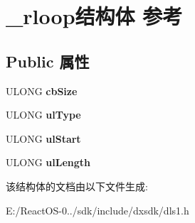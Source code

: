 \hypertarget{struct__rloop}{}\section{\+\_\+rloop结构体 参考}
\label{struct__rloop}
\subsection*{Public 属性}
\begin{DoxyCompactItemize}
\item 
\mbox{\label{struct__rloop_a14066c8888646ff2034e8e474b0f75e8}} 
U\+L\+O\+NG {\bfseries cb\+Size}
\item 
\mbox{\label{struct__rloop_a614e0b1096b1f12aeda7e573ce1a4891}} 
U\+L\+O\+NG {\bfseries ul\+Type}
\item 
\mbox{\label{struct__rloop_a8d33e0d2aacebfa399f701a1f3f7b75f}} 
U\+L\+O\+NG {\bfseries ul\+Start}
\item 
\mbox{\label{struct__rloop_a3d021fa132e08c6b78181f7b2c6d32a2}} 
U\+L\+O\+NG {\bfseries ul\+Length}
\end{DoxyCompactItemize}


该结构体的文档由以下文件生成\+:\begin{DoxyCompactItemize}
\item 
E\+:/\+React\+O\+S-\/0../sdk/include/dxsdk/dls1.\+h\end{DoxyCompactItemize}
